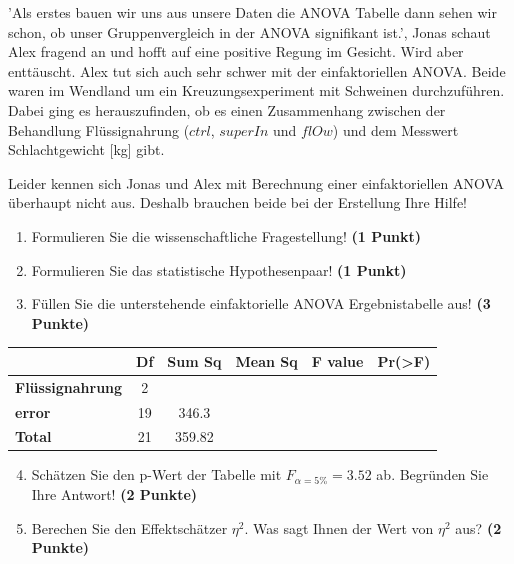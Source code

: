 \documentclass[a4paper, 9pt]{scrartcl}\usepackage[]{graphicx}\usepackage[]{xcolor}
\begin{document}
'Als erstes bauen wir uns aus unsere Daten die ANOVA Tabelle dann sehen wir schon, ob unser Gruppenvergleich in der ANOVA signifikant ist.', Jonas schaut Alex fragend an und hofft auf eine positive Regung im Gesicht. Wird aber enttäuscht. Alex tut sich auch sehr schwer mit der einfaktoriellen ANOVA. Beide waren im Wendland um ein Kreuzungsexperiment mit Schweinen durchzuführen. Dabei ging es herauszufinden, ob es einen Zusammenhang zwischen der Behandlung Flüssignahrung ($ctrl$, $superIn$ und $flOw$) und dem Messwert Schlachtgewicht [kg] gibt.



\vspace{1ex}

Leider kennen sich Jonas und Alex mit Berechnung einer einfaktoriellen ANOVA überhaupt nicht aus. Deshalb brauchen beide bei der Erstellung Ihre Hilfe! 

\begin{enumerate}
  \item Formulieren Sie die wissenschaftliche Fragestellung! \textbf{(1 Punkt)}
  \item Formulieren Sie das statistische Hypothesenpaar! \textbf{(1 Punkt)}
\item Füllen Sie die unterstehende einfaktorielle ANOVA Ergebnistabelle aus! \textbf{(3 Punkte)}
\end{enumerate}

\vspace{1Ex}

\begin{center}
  \Large
  \begin{tabular}{lccccp{3cm}}
\toprule
     & \textbf{Df} & \textbf{Sum Sq} & \textbf{Mean Sq} & \textbf{F value} & \textbf{Pr(>F)} \strut\\
    \midrule
   \textbf{Flüssignahrung}  & 2 &  &  &  &  \strut\\
   \textbf{error}  & 19 & 346.3 &  &  &  \strut\\
   \textbf{Total}  & 21 & 359.82 &  &  &  \strut\\
\bottomrule
  \end{tabular}
\end{center}

\vspace{1Ex}

\begin{enumerate}
  \setcounter{enumi}{3}
\item Schätzen Sie den p-Wert der Tabelle mit $F_{\alpha = 5\%} = 3.52$ ab. Begründen Sie Ihre Antwort! \textbf{(2 Punkte)}
\item Berechen Sie den Effektschätzer $\eta^2$. Was sagt Ihnen der Wert von $\eta^2$ aus? \textbf{(2 Punkte)}
\end{enumerate}
\end{document}
